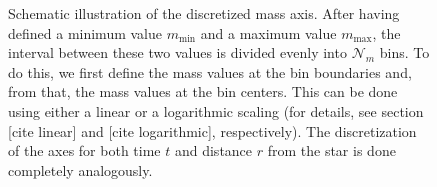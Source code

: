\begin{figure}[h!]
\begin{center}
    \end{center}
    \caption{Schematic illustration of the discretized mass axis. After having defined a minimum 
        value $m_\text{min}$ and a maximum value $m_\text{max}$, the interval between these two 
        values is divided evenly into $\mathcal N_m$ bins. To do this, we first define the mass
        values at the bin boundaries and, from that, the mass values at the bin centers. 
        This can be done using either a linear or a logarithmic scaling (for details, see section
        [cite linear] and [cite logarithmic], respectively). The discretization of the 
        axes for both time $t$ and distance $r$ from the star is done completely analogously.}
    \label{fig:continuous_and_discrete_mass_axis}
\end{figure}


